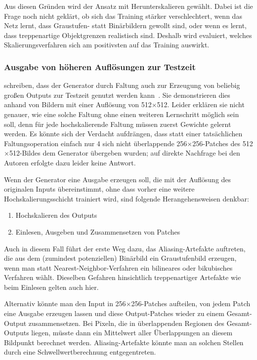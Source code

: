 Aus diesen Gründen wird der Ansatz mit Herunterskalieren gewählt.
Dabei ist die Frage noch nicht geklärt, ob sich das Training stärker verschlechtert, wenn das Netz lernt, dass Graustufen- statt Binärbildern gewollt sind, oder wenn es lernt, dass treppenartige Objektgrenzen realistisch sind.
Deshalb wird evaluiert, welches Skalierungsverfahren sich am positivsten auf das Training auswirkt.



\subsubsection{Ausgabe von höheren Auflösungen zur Testzeit}

\citeauthor{Isola.2017} schreiben, dass der Generator durch Faltung auch zur Erzeugung von beliebig großen Outputs zur Testzeit genutzt werden kann~\cite{Isola.2017}.
Sie demonstrieren dies anhand von Bildern mit einer Auflösung von 512$\times$512.
Leider erklären sie nicht genauer, wie eine solche Faltung ohne einen weiteren Lernschritt möglich sein soll, denn für jede hochskalierende Faltung müssen zuerst Gewichte gelernt werden.
Es könnte sich der Verdacht aufdrängen, dass statt einer tatsächlichen Faltungsoperation einfach nur 4 sich nicht überlappende 256$\times$256-Patches des 512$\times$512-Bildes dem Generator übergeben wurden; auf direkte Nachfrage bei den Autoren erfolgte dazu leider keine Antwort.

Wenn der Generator eine Ausgabe erzeugen soll, die mit der Auflösung des originalen Inputs übereinstimmt, ohne dass vorher eine weitere Hochskalierungsschicht trainiert wird, sind folgende Herangehensweisen denkbar:

\begin{enumerate}
	\item Hochskalieren des Outputs
	\item Einlesen, Ausgeben und Zusammensetzen von Patches
\end{enumerate}

Auch in diesem Fall führt der erste Weg dazu, das Aliasing-Artefakte auftreten, die aus dem (zumindest potenziellen) Binärbild ein Graustufenbild erzeugen, wenn man statt Nearest-Neighbor-Verfahren ein bilineares oder bikubisches Verfahren wählt.
Dieselben Gefahren hinsichtlich treppenartiger Artefakte wie beim Einlesen gelten auch hier.

Alternativ könnte man den Input in 256$\times$256-Patches aufteilen, von jedem Patch eine Ausgabe erzeugen lassen und diese Output-Patches wieder zu einem Gesamt-Output zusammensetzen.
Bei Pixeln, die in überlappenden Regionen des Gesamt-Outputs liegen, müsste dann ein Mittelwert aller Überlappungen an diesem Bildpunkt berechnet werden.
Aliasing-Artefakte könnte man an solchen Stellen durch eine Schwellwertberechnung entgegentreten.

